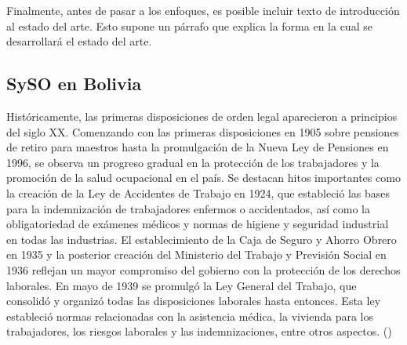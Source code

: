 Finalmente, antes de pasar a los enfoques, es posible incluir texto de introducción al estado del arte. Esto supone un párrafo que explica la forma en la cual se desarrollará el estado del arte.
\subsection{SySO en Bolivia}
Históricamente, las primeras disposiciones de orden legal aparecieron a principios del siglo XX. Comenzando con las primeras disposiciones en 1905 sobre pensiones de retiro para maestros hasta la promulgación de la Nueva Ley de Pensiones en 1996, se observa un progreso gradual en la protección de los trabajadores y la promoción de la salud ocupacional en el país.
Se destacan hitos importantes como la creación de la Ley de Accidentes de Trabajo en 1924, que estableció las bases para la indemnización de trabajadores enfermos o accidentados, así como la obligatoriedad de exámenes médicos y normas de higiene y seguridad industrial en todas las industrias.
El establecimiento de la Caja de Seguro y Ahorro Obrero en 1935 y la posterior creación del Ministerio del Trabajo y Previsión Social en 1936 reflejan un mayor compromiso del gobierno con la protección de los derechos laborales. En mayo de 1939 se promulgó la Ley General del Trabajo, que consolidó y organizó todas las disposiciones laborales hasta entonces. Esta ley estableció normas relacionadas con la asistencia médica, la vivienda para los trabajadores, los riesgos laborales y las indemnizaciones, entre otros aspectos. (\cite{cervantesdiagnostico})

